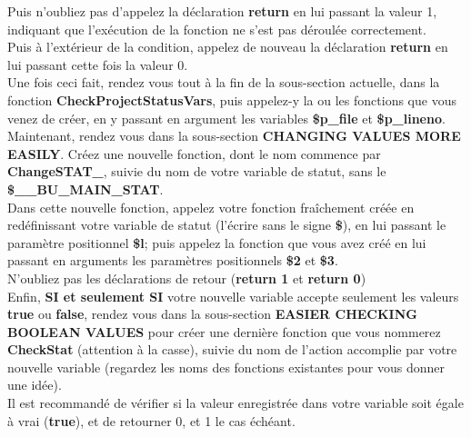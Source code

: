 \documentclass[a4paper,10pt]{article}
\begin{document}
Puis n'oubliez pas d'appelez la déclaration \textbf{\color{gray}return} en lui passant la valeur 1, indiquant que l'exécution de la fonction ne s'est pas déroulée correctement.\\[1\baselineskip]

Puis à l'extérieur de la condition, appelez de nouveau la déclaration \textbf{\color{gray}return} en lui passant cette fois la valeur 0.\\[1\baselineskip]

Une fois ceci fait, rendez vous tout à la fin de la sous-section actuelle, dans la fonction \textbf{\color{mauve}CheckProjectStatusVars}, puis appelez-y la ou les fonctions que vous venez de créer, en y passant en argument les variables \textbf{\color{orange}\$p\_file} et \textbf{\color{orange}\$p\_lineno}.\\[2\baselineskip]


Maintenant, rendez vous dans la sous-section \textbf{CHANGING VALUES MORE EASILY}. Créez une nouvelle fonction, dont le nom commence par \textbf{\color{mauve}ChangeSTAT\_}, suivie du nom de votre variable de statut, sans le \textbf{\color{orange}\$\_\_BU\_MAIN\_STAT}.\\[1\baselineskip]

Dans cette nouvelle fonction, appelez votre fonction fraîchement créée en redéfinissant votre variable de statut (l'écrire sans le signe \textbf{\$}), en lui passant le paramètre positionnel \textbf{\$l}; puis appelez la fonction que vous avez créé en lui passant en arguments les paramètres positionnels \textbf{\$2} et \textbf{\$3}.\\[1\baselineskip]

N'oubliez pas les déclarations de retour (\textbf{\color{gray}return 1} et \textbf{\color{gray}return 0})\\[2\baselineskip]


Enfin, \textbf{SI et seulement SI} votre nouvelle variable accepte seulement les valeurs \textbf{true} ou \textbf{false}, rendez vous dans la sous-section \textbf{EASIER CHECKING BOOLEAN VALUES} pour créer une dernière fonction que vous nommerez \textbf{\color{mauve}CheckStat} (attention à la casse), suivie du nom de l'action accomplie par votre nouvelle variable (regardez les noms des fonctions existantes pour vous donner une idée).\\[1\baselineskip]

Il est recommandé de vérifier si la valeur enregistrée dans votre variable soit égale à vrai (\textbf{true}), et de retourner 0, et 1 le cas échéant.\\[2\baselineskip]
\end{document}
